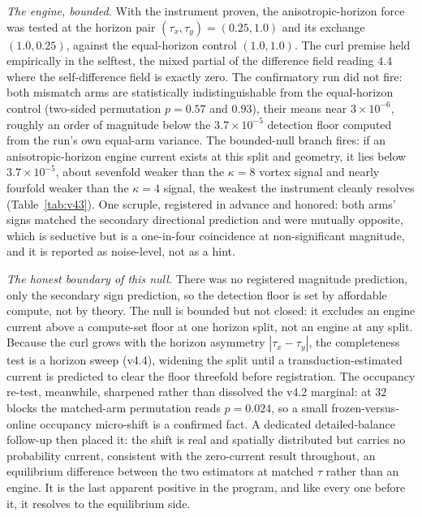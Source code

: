 \documentclass[11pt]{article}
\begin{document}
\emph{The engine, bounded.} With the instrument proven, the anisotropic-horizon force was tested at the horizon pair $(\tau_x, \tau_y) = (0.25, 1.0)$ and its exchange $(1.0, 0.25)$, against the equal-horizon control $(1.0, 1.0)$. The curl premise held empirically in the selftest, the mixed partial of the difference field reading $4.4$ where the self-difference field is exactly zero. The confirmatory run did not fire: both mismatch arms are statistically indistinguishable from the equal-horizon control (two-sided permutation $p = 0.57$ and $0.93$), their means near $3\times10^{-6}$, roughly an order of magnitude below the $3.7\times10^{-5}$ detection floor computed from the run's own equal-arm variance. The bounded-null branch fires: if an anisotropic-horizon engine current exists at this split and geometry, it lies below $3.7\times10^{-5}$, about sevenfold weaker than the $\kappa{=}8$ vortex signal and nearly fourfold weaker than the $\kappa{=}4$ signal, the weakest the instrument cleanly resolves (Table~\ref{tab:v43}). One scruple, registered in advance and honored: both arms' signs matched the secondary directional prediction and were mutually opposite, which is seductive but is a one-in-four coincidence at non-significant magnitude, and it is reported as noise-level, not as a hint.

\emph{The honest boundary of this null.} There was no registered magnitude prediction, only the secondary sign prediction, so the detection floor is set by affordable compute, not by theory. The null is bounded but not closed: it excludes an engine current above a compute-set floor at one horizon split, not an engine at any split. Because the curl grows with the horizon asymmetry $|\tau_x - \tau_y|$, the completeness test is a horizon sweep (v4.4), widening the split until a transduction-estimated current is predicted to clear the floor threefold before registration. The occupancy re-test, meanwhile, sharpened rather than dissolved the v4.2 marginal: at $32$ blocks the matched-arm permutation reads $p = 0.024$, so a small frozen-versus-online occupancy micro-shift is a confirmed fact. A dedicated detailed-balance follow-up then placed it: the shift is real and spatially distributed but carries no probability current, consistent with the zero-current result throughout, an equilibrium difference between the two estimators at matched $\tau$ rather than an engine. It is the last apparent positive in the program, and like every one before it, it resolves to the equilibrium side.
\end{document}
